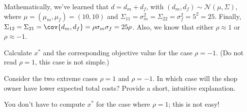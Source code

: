 Mathematically, we've learned that $d = d_m + d_f$, with $(d_m, d_f) \sim \mathcal{N}(\mu, \Sigma)$, where $\mu = (\mu_m, \mu_f) = (10,10)$ and $\Sigma_{11} = \sigma_m^2 = \Sigma_{22}  = \sigma_f^2 = 5^2 = 25$. Finally, $\Sigma_{12} = \Sigma_{21} = \cov{d_m, d_f} = \rho \sigma_m \sigma_f = 25 \rho$. Also, we know that either $\rho \approx 1$ or $\rho \approx -1$.

\begin{exercise}
 Calculate $x^*$ and the corresponding objective value for the case $\rho = -1$. (Do not read  $\rho=1$, this case is not simple.)
\end{exercise}

\begin{exercise}
Consider the two extreme cases $\rho = 1$ and $\rho = -1$.
In which case will the shop owner have lower expected total costs?
Provide a short, intuitive explanation.
\begin{hint}
You don't have to compute $x^*$ for the case where $\rho = 1$; this is not easy!
\end{hint}
\end{exercise}




